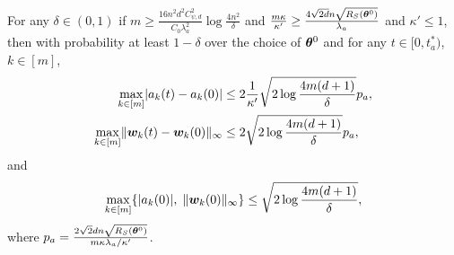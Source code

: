 \documentclass{article}
\begin{document}
\begin{prop}
    For any $\delta\in(0,1)$ if $m\geq\frac{16n^2d^2C^2_{\psi,d}}{C_0\lambda_a^2}\log\frac{4n^2}{\delta}$ and $\frac{m\kappa}{\kappa'}\geq\frac{4\sqrt{2d}n\sqrt{R_S(\bm{\theta}^0)}}{\lambda_a}$ and $\kappa'\leq 1$, then with probability at least $1-\delta$ over the choice of $\bm{\theta}^0$ and for any $t\in[0,t^*_a)$, $k\in[m]$,
    \begin{equation}
        \begin{aligned}
            \max\limits_{k\in[m]}\lvert a_k(t) - a_k(0)\rvert
             & \leq 2\frac{1}{\kappa'}\sqrt{2\log\frac{4m(d+1)}{\delta}}p_a, \\
            \max\limits_{k\in[m]}\lVert\bm{w}_k(t) - \bm{w}_k(0)\rVert_{\infty}
             & \leq 2\sqrt{2\log\frac{4m(d+1)}{\delta}}p_a,
        \end{aligned}
    \end{equation}
    and
    \begin{equation}
        \max\limits_{k\in[m]}\{\lvert a_k(0)\rvert,\;\lVert\bm{w}_k(0)\rVert_{\infty}\} \leq \sqrt{2\log\frac{4m(d+1)}{\delta}},
    \end{equation}
    where $p_a=\frac{2\sqrt{2}dn\sqrt{R_S(\bm{\theta}^0)}}{m\kappa\lambda_a/\kappa'}$.
\end{prop}
\end{document}
